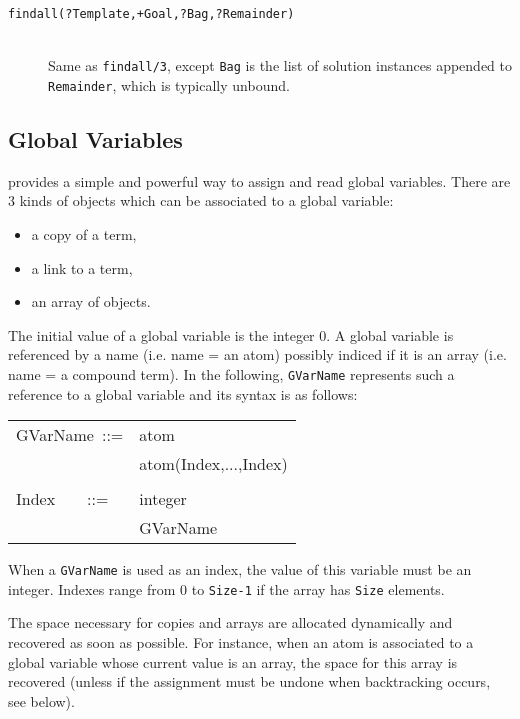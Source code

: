 \begin{description}
\item [{\tt findall(?Template,+Goal,?Bag,?Remainder)}]~\\
	Same as {\tt findall/3}, except {\tt Bag} is the list of solution
	instances appended to {\tt Remainder}, which is typically unbound.

\end{description}


\subsection{Global Variables}

{\wamcc} provides a simple and powerful way to assign and read global
variables. There are 3 kinds of objects which can be associated to a
global variable: 

\begin{itemize}

\item a copy of a term,

\item a link to a term,

\item an array of objects.

\end{itemize}

The initial value of a global variable is the integer 0.
A global variable is referenced by a name (i.e. name = an atom)
possibly indiced if it is an array (i.e. name = a compound term). In
the following, {\tt GVarName} represents such a reference to a global
variable and its syntax is as follows: 

\begin{center}
\begin{tt}
\begin{tabular}{ll}

GVarName~::=    & atom \\
		& atom(Index,...,Index) \\
		& \\
Index~~~~::=	& integer \\
		& GVarName 
\end{tabular}
\end{tt}
\end{center}

When a {\tt GVarName} is used as an index, the value of this variable
must be an integer. Indexes range from 0 to {\tt Size-1} if the array
has {\tt Size} elements.

The space necessary for copies and arrays are allocated dynamically
and recovered as soon as possible. For instance, when an atom is
associated to a global variable whose current value is an array, the
space for this array is recovered (unless if the assignment must be
undone when backtracking occurs, see below).

